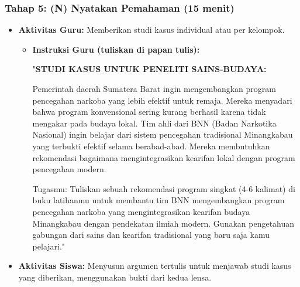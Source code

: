 \documentclass[a4paper,12pt]{article}
\begin{document}
\subsubsection{Tahap 5: (N) Nyatakan Pemahaman (15 menit)}
\begin{itemize}
\item \textbf{Aktivitas Guru:} Memberikan studi kasus individual atau per kelompok.
    \begin{itemize}
    \item \textbf{Instruksi Guru (tuliskan di papan tulis):}
    
    "\textbf{STUDI KASUS UNTUK PENELITI SAINS-BUDAYA:}
    
    Pemerintah daerah Sumatera Barat ingin mengembangkan program pencegahan narkoba yang lebih efektif untuk remaja. Mereka menyadari bahwa program konvensional sering kurang berhasil karena tidak mengakar pada budaya lokal. Tim ahli dari BNN (Badan Narkotika Nasional) ingin belajar dari sistem pencegahan tradisional Minangkabau yang terbukti efektif selama berabad-abad. Mereka membutuhkan rekomendasi bagaimana mengintegrasikan kearifan lokal dengan program pencegahan modern.
    
    Tugasmu: Tuliskan sebuah rekomendasi program singkat (4-6 kalimat) di buku latihanmu untuk membantu tim BNN mengembangkan program pencegahan narkoba yang mengintegrasikan kearifan budaya Minangkabau dengan pendekatan ilmiah modern. Gunakan pengetahuan gabungan dari sains dan kearifan tradisional yang baru saja kamu pelajari."
    \end{itemize}
\item \textbf{Aktivitas Siswa:} Menyusun argumen tertulis untuk menjawab studi kasus yang diberikan, menggunakan bukti dari kedua lensa.
\end{itemize}
\end{document}
